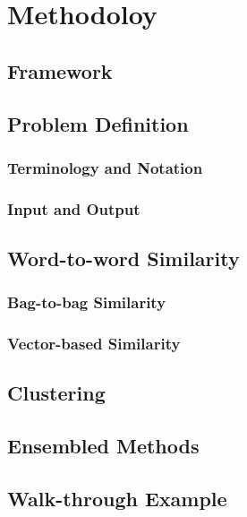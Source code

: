 \chapter{Methodoloy}

\section{Framework} %
\section{Problem Definition}
	\subsection{Terminology and Notation}
	\subsection{Input and Output}
\section{Word-to-word Similarity}                                                            
	\subsection{Bag-to-bag Similarity} %
	\subsection{Vector-based Similarity} %
\section{Clustering} %
\section{Ensembled Methods} %
\section{Walk-through Example} %
